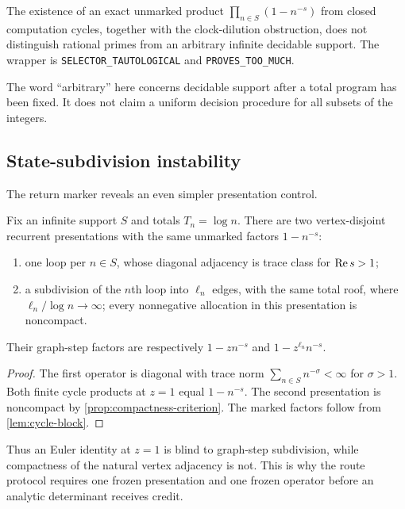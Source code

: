 \begin{corollary}
\label{cor:selector}
The existence of an exact unmarked product
$\prod_{n\in S}(1-n^{-s})$ from closed computation cycles, together with the
clock-dilution obstruction, does not distinguish rational primes from an
arbitrary infinite decidable support.  The wrapper is
\texttt{SELECTOR\_TAUTOLOGICAL} and \texttt{PROVES\_TOO\_MUCH}.
\end{corollary}

The word ``arbitrary'' here concerns decidable support after a total program
has been fixed.  It does not claim a uniform decision procedure for all
subsets of the integers.

\subsection{State-subdivision instability}

The return marker reveals an even simpler presentation control.

\begin{theorem}
\label{thm:subdivision}
Fix an infinite support $S$ and totals $T_n=\log n$.  There are two
vertex-disjoint recurrent presentations with the same unmarked factors
$1-n^{-s}$:

\begin{enumerate}
\item one loop per $n\in S$, whose diagonal adjacency is trace class for
$\operatorname{Re} s>1$;
\item a subdivision of the $n$th loop into $\ell_n$ edges, with the same
total roof, where $\ell_n/\log n\to\infty$; every nonnegative allocation in
this presentation is noncompact.
\end{enumerate}

Their graph-step factors are respectively $1-zn^{-s}$ and
$1-z^{\ell_n}n^{-s}$.
\end{theorem}

\begin{proof}
The first operator is diagonal with trace norm
$\sum_{n\in S}n^{-\sigma}<\infty$ for $\sigma>1$.  Both finite cycle products
at $z=1$ equal $1-n^{-s}$.  The second presentation is noncompact by
\cref{prop:compactness-criterion}.  The marked factors follow from
\cref{lem:cycle-block}.
\end{proof}

Thus an Euler identity at $z=1$ is blind to graph-step subdivision, while
compactness of the natural vertex adjacency is not.  This is why the route
protocol requires one frozen presentation and one frozen operator before an
analytic determinant receives credit.
